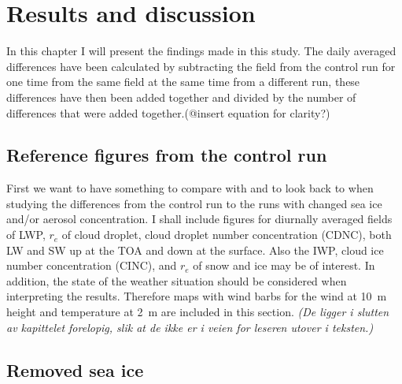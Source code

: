 \chapter{Results and discussion}
\label{chap:results}
In this chapter I will present the findings made in this study.  The daily averaged differences have been calculated by subtracting the field from the control run for one time from the same field at the same time from a different run, these differences have then been added together and divided by the number of differences that were added together.(@insert equation for clarity?)

\section{Reference figures from the control run}
First we want to have something to compare with and to look back to when studying the differences from the control run to the runs with changed sea ice and/or aerosol concentration. I shall include figures for diurnally averaged fields of LWP, $r_e$ of cloud droplet, cloud droplet number concentration (CDNC), both LW and SW up at the TOA and down at the surface. Also the IWP, cloud ice number concentration (CINC), and $r_e$ of snow and ice may be of interest. In addition, the state of the weather situation should be considered when interpreting the results. Therefore maps with wind barbs for the wind at 10~m height and temperature at 2~m are included in this section. \textit{(De ligger i slutten av kapittelet forelopig, slik at de ikke er i veien for leseren utover i teksten.)}	

\section{Removed sea ice}
